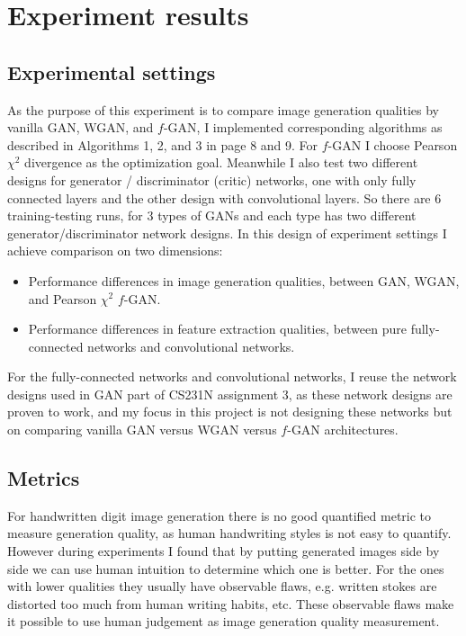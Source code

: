 \documentclass[10pt,twocolumn,letterpaper]{article}
\begin{document}
\section{Experiment results}
\label{experiments}

\subsection{Experimental settings}
\label{exp_settings}
As the purpose of this experiment is to compare image generation qualities by vanilla GAN, WGAN, and $f$-GAN, I implemented corresponding algorithms as described in Algorithms 1, 2, and 3 in page 8 and 9. For $f$-GAN I choose Pearson $\chi^2$ divergence as the optimization goal. Meanwhile I also test two different designs for generator / discriminator (critic) networks, one with only fully connected layers and the other design with convolutional layers. So there are 6 training-testing runs, for 3 types of GANs and each type has two different generator/discriminator network designs. In this design of experiment settings I achieve comparison on two dimensions:
\begin{itemize}
    \item Performance differences in image generation qualities, between GAN, WGAN, and Pearson $\chi^2$ $f$-GAN.
    \item Performance differences in feature extraction qualities, between pure fully-connected networks and convolutional networks.
\end{itemize}

For the fully-connected networks and convolutional networks, I reuse the network designs used in GAN part of CS231N assignment 3, as these network designs are proven to work, and my focus in this project is not designing these networks but on comparing vanilla GAN versus WGAN versus $f$-GAN architectures. 

\subsection{Metrics}
\label{metrics}
For handwritten digit image generation there is no good quantified metric to measure generation quality, as human handwriting styles is not easy to quantify. However during experiments I found that by putting generated images side by side we can use human intuition to determine which one is better. For the ones with lower qualities they usually have observable flaws, e.g. written stokes are distorted too much from human writing habits, etc. These observable flaws make it possible to use human judgement as image generation quality measurement.
\end{document}

